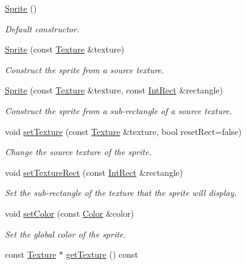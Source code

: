 \begin{DoxyCompactItemize}
\item 
\hyperlink{classsf_1_1_sprite_a92559fbca895a96758abf5eabab96984}{Sprite} ()
\begin{DoxyCompactList}\small\item\em Default constructor. \end{DoxyCompactList}\item 
\hyperlink{classsf_1_1_sprite_a2a9fca374d7abf084bb1c143a879ff4a}{Sprite} (const \hyperlink{classsf_1_1_texture}{Texture} \&texture)
\begin{DoxyCompactList}\small\item\em Construct the sprite from a source texture. \end{DoxyCompactList}\item 
\hyperlink{classsf_1_1_sprite_a01cfe1402372d243dbaa2ffa96020206}{Sprite} (const \hyperlink{classsf_1_1_texture}{Texture} \&texture, const \hyperlink{classsf_1_1_rect}{Int\+Rect} \&rectangle)
\begin{DoxyCompactList}\small\item\em Construct the sprite from a sub-\/rectangle of a source texture. \end{DoxyCompactList}\item 
void \hyperlink{classsf_1_1_sprite_a3729c88d88ac38c19317c18e87242560}{set\+Texture} (const \hyperlink{classsf_1_1_texture}{Texture} \&texture, bool reset\+Rect=false)
\begin{DoxyCompactList}\small\item\em Change the source texture of the sprite. \end{DoxyCompactList}\item 
void \hyperlink{classsf_1_1_sprite_a3fefec419a4e6a90c0fd54c793d82ec2}{set\+Texture\+Rect} (const \hyperlink{classsf_1_1_rect}{Int\+Rect} \&rectangle)
\begin{DoxyCompactList}\small\item\em Set the sub-\/rectangle of the texture that the sprite will display. \end{DoxyCompactList}\item 
void \hyperlink{classsf_1_1_sprite_a14def44da6437bfea20c4df5e71aba4c}{set\+Color} (const \hyperlink{classsf_1_1_color}{Color} \&color)
\begin{DoxyCompactList}\small\item\em Set the global color of the sprite. \end{DoxyCompactList}\item 
const \hyperlink{classsf_1_1_texture}{Texture} $\ast$ \hyperlink{classsf_1_1_sprite_a1a76155146c8ff37c4eb5a306b4e9ebe}{get\+Texture} () const

\end{DoxyCompactItemize}
